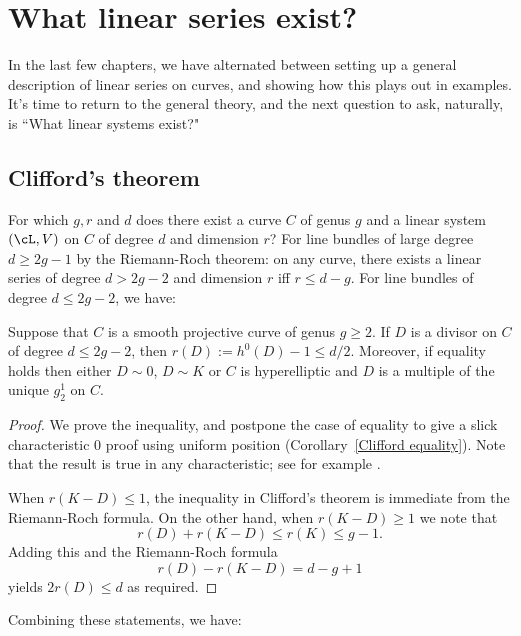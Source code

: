 

\chapter{What linear series exist?}\label{Brill-Noether}\label{BNChapter}

In the last few chapters, we have alternated between setting up a general description of linear series on curves, and showing how this plays out in examples. It's time to return to the general theory, and the next question to ask, naturally, is ``What linear systems exist?"

\section{Clifford's theorem}
For which $g, r$ and $d$ does there exist a curve $C$ of genus $g$ and a linear system $(\cL,V)$ on $C$ of degree $d$ and dimension $r$? For line bundles of large degree $d \geq 2g-1$ by the Riemann-Roch theorem: on any curve, there exists a linear series of degree $d > 2g-2$ and dimension $r$ iff $r \leq d-g$. For line bundles of degree $d \leq 2g-2$, we have:

\begin{theorem}\label{Clifford}
Suppose that $C$ is a smooth projective curve of genus $g\geq 2$. If $D$ is a divisor on $C$ of degree $d \leq 2g-2$, then $r(D) := h^0(D) - 1 \leq d/2$. Moreover, if equality holds then either $D\sim 0$, $D\sim K$ or
 $C$ is hyperelliptic and $D$ is a multiple of the unique $g^1_2$ on $C$.
\end{theorem}

\begin{proof} We prove the inequality, and  postpone the case of equality to give a slick characteristic 0 proof using  uniform position (Corollary~\ref{Clifford equality}). Note that the result is true in any characteristic; see for example \cite[Theorem ****]{Hartshorne1977}.

When $r(K-D)\leq 1$, the inequality in Clifford's theorem is immediate from the Riemann-Roch formula. On the other hand, when $r(K-D) \geq 1$ we note that
$$
 r(D)+r(K-D) \leq r(K) \leq g-1.
$$
Adding this and the Riemann-Roch formula
$$
r(D)-r(K-D) = d - g +1
$$
yields $2r(D)\leq d$ as required.
\end{proof}

Combining these statements, we have:

